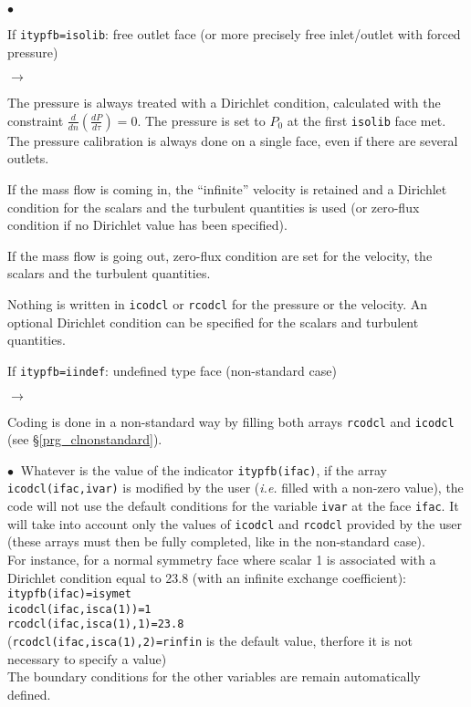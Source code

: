 {{{\begin{list}{$\bullet$}{}
\item If \texttt{itypfb=isolib}: free outlet face (or more precisely free 
      inlet/outlet with forced pressure)
\begin{list}{$\rightarrow$}{}
\item The pressure is always treated with a Dirichlet condition, calculated
      with the constraint $\displaystyle \frac{d}{dn}\left(\frac{dP}{d\tau}\right)=0$.
      The pressure is set to $P_0$ at the first \texttt{isolib} face met.
      The pressure calibration is always done on a single face, even if there are
      several outlets.
\item If the mass flow is coming in, the ``infinite'' velocity is retained
      and a Dirichlet condition for the scalars and the turbulent quantities is used
      (or zero-flux condition if no Dirichlet value has been specified).
\item If the mass flow is going out, zero-flux condition are set for the velocity,
      the scalars and the turbulent quantities.
\item Nothing is written in \texttt{icodcl} or \texttt{rcodcl} for the pressure or
      the velocity. An optional Dirichlet condition can be specified for the scalars
      and turbulent quantities.
\end{list}

\item If \texttt{itypfb=iindef}: undefined type face (non-standard case)
\begin{list}{$\rightarrow$}{}
\item Coding is done in a non-standard way by filling both arrays \texttt{rcodcl} and
      \texttt{icodcl} (see \S\ref{prg_clnonstandard}).
\end{list}
\end{list}

$\bullet\ $ Whatever is the value of the indicator \texttt{itypfb(ifac)}, if
the array \texttt{icodcl(ifac,ivar)} is modified by the user ({\em i.e.} filled
with a non-zero value), the code will not use the default
conditions for the variable \texttt{ivar} at the face \texttt{ifac}. It will
take into account only the values of \texttt{icodcl} and \texttt{rcodcl} provided by the
user (these arrays must then be fully completed, like in the non-standard case). \\
For instance, for a normal symmetry face where scalar 1 is associated with a
Dirichlet condition equal to 23.8 (with an infinite exchange
coefficient):\\
\hspace*{2cm}\texttt{itypfb(ifac)=isymet}\\
\hspace*{2cm}\texttt{icodcl(ifac,isca(1))=1}\\
\hspace*{2cm}\texttt{rcodcl(ifac,isca(1),1)=23.8}\\
(\texttt{rcodcl(ifac,isca(1),2)=rinfin} is the default value, therfore it is
not necessary to specify a value)\\
The boundary conditions for the other variables are remain automatically
defined.

}}}
